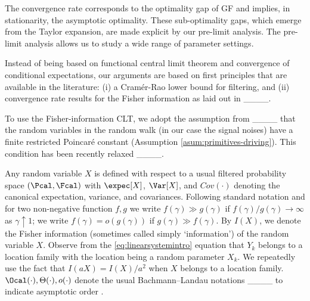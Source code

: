  The convergence rate corresponds to the optimality gap of GF and implies, in stationarity, the asymptotic optimality. These sub-optimality gaps, which emerge from the Taylor expansion, are made explicit by our pre-limit analysis. The pre-limit analysis allows us to study a wide range of parameter settings. 
 
 Instead of being based on functional central limit theorem and convergence of conditional expectations, our arguments are based on first principles that are available in the literature: (i) a Cramér-Rao lower bound for filtering, and (ii) convergence rate results for the Fisher information as laid out in ____. 
 
\iffalse Their argument rely explicitly on the Gaussianity. Relying on more recent results in the CLT literature, we expand the coverage to the non-Gaussian signal noise. Our arguments are direct and simple and cover the spectrum of regimes. As a final note, their model is seemingly different from ours. In their model the signal is a continuous time process and the observation are spaced out and discrete. The variance of the observation noise depends on the interval between consecutive observations and the assumption is that over inter-observation period of length $\Delta$, the observation noise has standard deviation of magnitude $\sqrt{\Delta}$ (with $\Delta$ small). In our case, we consider a discrete time system and the scaling correspond to the scaling of the noise terms in both the signal and the observation. However, their results can be equivalently formulated within our discrete time framework.  \fi 

To use the Fisher-information CLT, we adopt the assumption from ____ that the random variables in the random walk (in our case the signal noises) have a finite restricted Poincaré constant (Assumption \ref{asum:primitives-driving}). This condition has been recently relaxed ____. 
\vspace*{0.2cm} 

 Any random variable $X$ is defined with respect to a usual filtered probability space $(\Pcal,\Fcal)$ with $\expec[X]$, $\Var[X]$, and $Cov(\cdot)$ denoting the canonical expectation, variance, and covariances. Following standard notation and for two non-negative function $f,g$ we write $f(\gamma)\gg g(\gamma)$ if $f(\gamma)/g(\gamma) \rightarrow \infty$ as $\gamma \uparrow 1$; we write  $f(\gamma)=o(g(\gamma))$ if $g(\gamma)\gg f(\gamma)$. By $I(X)$, we denote the Fisher information (sometimes called simply ‘information’) of the random variable $X$. Observe from the \ref{eq:linearsystemintro} equation that $Y_k$ belongs to a location family with the location being a random parameter $X_k$. We repeatedly use the fact that $I(aX)=I(X)/a^2$ when $X$ belongs to a location family. $\Ocal(\cdot),\Theta(\cdot), o(\cdot)$ denote the usual Bachmann–Landau notations ____ to indicate asymptotic order  .
